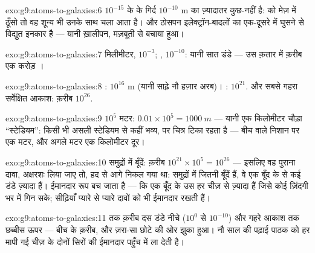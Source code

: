 \begin{solution}{exo:g9:atoms-to-galaxies:6}
 $10^{-15}$ के  के गिर्द $10^{-10}$ \unit{m} का ज़्यादातर
कुछ-नहीं है:  को मेज़ में ठूँसो तो वह शून्य भी उनके साथ चला
आता है। और ठोसपन इलेक्ट्रॉन-बादलों का एक-दूसरे में घुसने से विद्युत
इनकार है --- यानी ख़ालीपन, मज़बूती से बचाया हुआ।
\end{solution}

\begin{solution}{exo:g9:atoms-to-galaxies:7}
मिलीमीटर, $10^{-3}$; , $10^{-10}$: यानी सात डंडे --- उस
क़तार में क़रीब एक करोड़ ।
\end{solution}

\begin{solution}{exo:g9:atoms-to-galaxies:8}
: $10^{16}$ \unit{m} (यानी साढ़े नौ हज़ार अरब)। :
$10^{21}$. और सबसे गहरा सर्वेक्षित आकाश: क़रीब $10^{26}$.
\end{solution}

\begin{solution}{exo:g9:atoms-to-galaxies:9}
$10^{5}$ मटर: $0.01 \times 10^{5} = \qty{1000}{m}$ --- यानी एक
किलोमीटर चौड़ा ``स्टेडियम'': किसी भी असली स्टेडियम से कहीं भव्य, पर
चित्र टिका रहता है --- बीच वाले निशान पर एक मटर, और अगले मटर एक
किलोमीटर दूर।
\end{solution}

\begin{solution}{exo:g9:atoms-to-galaxies:10}
समुद्रों में बूँदें: क़रीब $10^{21} \times 10^{5} = 10^{26}$ ---
इसलिए वह पुराना दावा, अक्षरशः लिया जाए तो, हद से आगे निकल गया था:
समुद्रों में जितनी बूँदें हैं, वे एक बूँद के  से कई डंडे ज़्यादा
हैं। ईमानदार रूप बच जाता है --- कि एक बूँद के  उस हर चीज़ से
ज़्यादा हैं जिसे कोई ज़िंदगी भर में गिन सके; सीढ़ियाँ प्यारे से प्यारे
दावों को भी ईमानदार रखती हैं।
\end{solution}

\begin{solution}{exo:g9:atoms-to-galaxies:11}
 तक क़रीब दस डंडे नीचे ($10^{0}$ से $10^{-10}$) और गहरे आकाश तक
छब्बीस ऊपर --- बीच के क़रीब, और ज़रा-सा छोटे की ओर झुका हुआ। नौ
साल की पढ़ाई पाठक को हर मापी गई चीज़ के दोनों सिरों की ईमानदार पहुँच
में ला देती है।
\end{solution}

